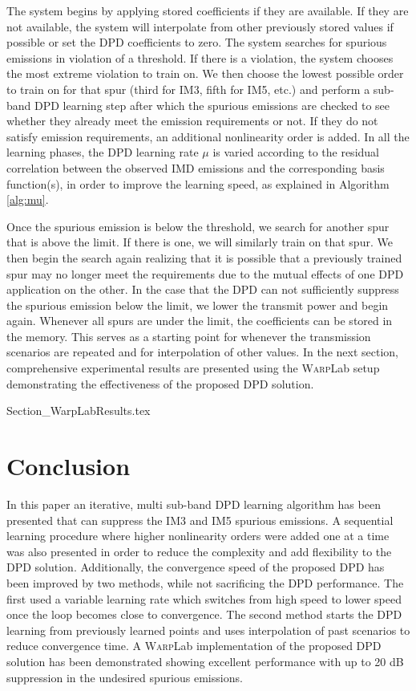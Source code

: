 The system begins by applying stored coefficients if they are available. 
If they are not available, the system will interpolate from other previously stored values if possible or set the DPD coefficients to zero. 
The system searches for spurious emissions in violation of a threshold. 
If there is a violation, the system chooses the most extreme violation to train on. 
We then choose the lowest possible order to train on for that spur (third for IM3, fifth for IM5, etc.) and perform a sub-band DPD learning step after which the spurious emissions are checked to see whether they already meet the emission requirements or not. 
If they do not satisfy emission requirements, an additional nonlinearity order is added. 
In all the learning phases, the DPD learning rate $\mu$ is varied according to the residual correlation between the observed IMD emissions and the corresponding basis function(s), in order to improve the learning speed, as explained in Algorithm \ref{alg:mu}. 

Once the spurious emission is below the threshold, we search for another spur that is above the limit. If there is one, we will similarly train on that spur. We then begin the search again realizing that it is possible that a previously trained spur may no longer meet the requirements due to the mutual effects of one DPD application on the other. In the case that the DPD can not sufficiently suppress the spurious emission below the limit, we lower the transmit power and begin again. Whenever all spurs are under the limit, the coefficients can be stored in the memory.
This serves as a starting point for whenever the transmission scenarios are repeated and for interpolation of other values. 
In the next section, comprehensive experimental results are presented using the \textsc{Warp}Lab setup demonstrating the effectiveness of the proposed DPD solution.

{Section_WarpLabResults.tex}

\section{Conclusion}
In this paper an iterative, multi sub-band DPD learning algorithm has been presented that can suppress the IM3 and IM5 spurious emissions. 
A sequential learning procedure where higher nonlinearity orders were added one at a time was also presented in order to reduce the complexity and add flexibility to the DPD solution. 
Additionally, the convergence speed of the proposed DPD has been improved by two methods, while not sacrificing the DPD performance. 
The first used a variable learning rate which switches from high speed to lower speed once the loop becomes close to convergence. 
The second method starts the DPD learning from previously learned points and uses interpolation of past scenarios to reduce convergence time. 
A \textsc{Warp}Lab implementation of the proposed DPD solution has been demonstrated showing excellent performance with up to 20 dB suppression in the undesired spurious emissions.

